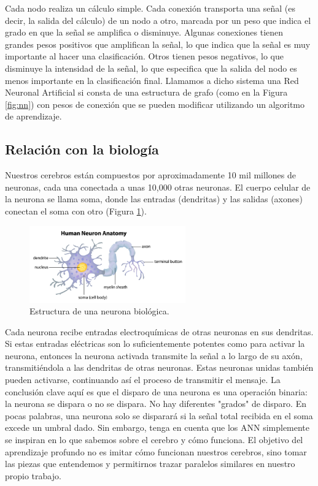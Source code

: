 \documentclass[a4paper,12pt]{article}
\begin{document}
Cada nodo realiza un cálculo simple. Cada conexión transporta una señal (es decir, la salida del cálculo) de un nodo a otro, marcada por un peso que indica el grado en que la señal se amplifica o disminuye. Algunas conexiones tienen grandes pesos positivos que amplifican la señal, lo que indica que la señal es muy importante al hacer una clasificación. Otros tienen pesos negativos, lo que disminuye la intensidad de la señal, lo que especifica que la salida del nodo es menos importante en la clasificación final. Llamamos a dicho sistema una Red Neuronal Artificial si consta de una estructura de grafo (como en la Figura \ref{fig:nn}) con pesos de conexión que se pueden modificar utilizando un algoritmo de aprendizaje.

\subsection{Relación con la biología}
Nuestros cerebros están compuestos por aproximadamente 10 mil millones de neuronas, cada una conectada a unas 10,000 otras neuronas. El cuerpo celular de la neurona se llama soma, donde las entradas (dendritas) y las salidas (axones) conectan el soma con otro (Figura \ref{fig:realneuron}).

\begin{figure}[H]
	\begin{center}				
	\includegraphics[width=0.6\textwidth]{019.png}
  	\caption{Estructura de una neurona biológica.}
  	\label{fig:realneuron}
  	\end{center}
\end{figure}


Cada neurona recibe entradas electroquímicas de otras neuronas en sus dendritas. Si estas entradas eléctricas son lo suficientemente potentes como para activar la neurona, entonces la neurona activada transmite la señal a lo largo de su axón, transmitiéndola a las dendritas de otras neuronas. Estas neuronas unidas también pueden activarse, continuando así el proceso de transmitir el mensaje.
La conclusión clave aquí es que el disparo de una neurona es una operación binaria: la neurona se dispara o no se dispara. No hay diferentes "grados" de disparo. En pocas palabras, una neurona solo se disparará si la señal total recibida en el soma excede un umbral dado.
Sin embargo, tenga en cuenta que los ANN simplemente se inspiran en lo que sabemos sobre el cerebro y cómo funciona. El objetivo del aprendizaje profundo no es imitar cómo funcionan nuestros cerebros, sino tomar las piezas que entendemos y permitirnos trazar paralelos similares en nuestro propio trabajo.
\end{document}
